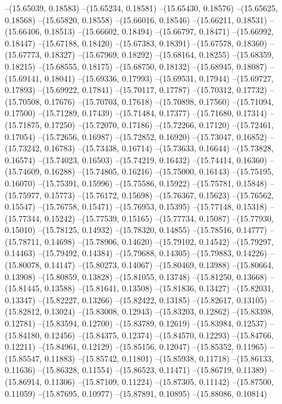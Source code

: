 --(15.65039, 0.18583)
--(15.65234, 0.18581)
--(15.65430, 0.18576)
--(15.65625, 0.18568)
--(15.65820, 0.18558)
--(15.66016, 0.18546)
--(15.66211, 0.18531)
--(15.66406, 0.18513)
--(15.66602, 0.18494)
--(15.66797, 0.18471)
--(15.66992, 0.18447)
--(15.67188, 0.18420)
--(15.67383, 0.18391)
--(15.67578, 0.18360)
--(15.67773, 0.18327)
--(15.67969, 0.18292)
--(15.68164, 0.18255)
--(15.68359, 0.18215)
--(15.68555, 0.18175)
--(15.68750, 0.18132)
--(15.68945, 0.18087)
--(15.69141, 0.18041)
--(15.69336, 0.17993)
--(15.69531, 0.17944)
--(15.69727, 0.17893)
--(15.69922, 0.17841)
--(15.70117, 0.17787)
--(15.70312, 0.17732)
--(15.70508, 0.17676)
--(15.70703, 0.17618)
--(15.70898, 0.17560)
--(15.71094, 0.17500)
--(15.71289, 0.17439)
--(15.71484, 0.17377)
--(15.71680, 0.17314)
--(15.71875, 0.17250)
--(15.72070, 0.17186)
--(15.72266, 0.17120)
--(15.72461, 0.17054)
--(15.72656, 0.16987)
--(15.72852, 0.16920)
--(15.73047, 0.16852)
--(15.73242, 0.16783)
--(15.73438, 0.16714)
--(15.73633, 0.16644)
--(15.73828, 0.16574)
--(15.74023, 0.16503)
--(15.74219, 0.16432)
--(15.74414, 0.16360)
--(15.74609, 0.16288)
--(15.74805, 0.16216)
--(15.75000, 0.16143)
--(15.75195, 0.16070)
--(15.75391, 0.15996)
--(15.75586, 0.15922)
--(15.75781, 0.15848)
--(15.75977, 0.15773)
--(15.76172, 0.15698)
--(15.76367, 0.15623)
--(15.76562, 0.15547)
--(15.76758, 0.15471)
--(15.76953, 0.15395)
--(15.77148, 0.15318)
--(15.77344, 0.15242)
--(15.77539, 0.15165)
--(15.77734, 0.15087)
--(15.77930, 0.15010)
--(15.78125, 0.14932)
--(15.78320, 0.14855)
--(15.78516, 0.14777)
--(15.78711, 0.14698)
--(15.78906, 0.14620)
--(15.79102, 0.14542)
--(15.79297, 0.14463)
--(15.79492, 0.14384)
--(15.79688, 0.14305)
--(15.79883, 0.14226)
--(15.80078, 0.14147)
--(15.80273, 0.14067)
--(15.80469, 0.13988)
--(15.80664, 0.13908)
--(15.80859, 0.13828)
--(15.81055, 0.13748)
--(15.81250, 0.13668)
--(15.81445, 0.13588)
--(15.81641, 0.13508)
--(15.81836, 0.13427)
--(15.82031, 0.13347)
--(15.82227, 0.13266)
--(15.82422, 0.13185)
--(15.82617, 0.13105)
--(15.82812, 0.13024)
--(15.83008, 0.12943)
--(15.83203, 0.12862)
--(15.83398, 0.12781)
--(15.83594, 0.12700)
--(15.83789, 0.12619)
--(15.83984, 0.12537)
--(15.84180, 0.12456)
--(15.84375, 0.12374)
--(15.84570, 0.12293)
--(15.84766, 0.12211)
--(15.84961, 0.12129)
--(15.85156, 0.12047)
--(15.85352, 0.11965)
--(15.85547, 0.11883)
--(15.85742, 0.11801)
--(15.85938, 0.11718)
--(15.86133, 0.11636)
--(15.86328, 0.11554)
--(15.86523, 0.11471)
--(15.86719, 0.11389)
--(15.86914, 0.11306)
--(15.87109, 0.11224)
--(15.87305, 0.11142)
--(15.87500, 0.11059)
--(15.87695, 0.10977)
--(15.87891, 0.10895)
--(15.88086, 0.10814)
